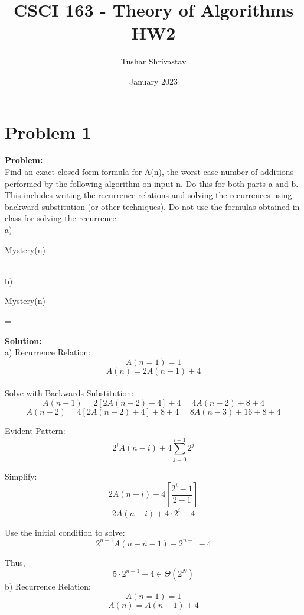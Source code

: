 \documentclass{article}
\title{CSCI 163 - Theory of Algorithms HW2}
\author{Tushar Shrivastav}
\date{January 2023}
\begin{document}
\maketitle

\section{Problem 1}
\textbf{Problem: }\\
Find an exact closed-form formula for A(n), the worst-case number of additions performed by the following algorithm on input n. Do this for both parts a
and b. This includes writing the recurrence relations and solving the recurrences using
backward substitution (or other techniques). Do not use the formulas obtained in class
for solving the recurrence. \\

a)
\begin{algorithm}
\caption{Mystery(n)}
\end{algorithm} \\
b)
\begin{algorithm}
\caption{Mystery(n)}
\temp = 
\end{algorithm}

\textbf{Solution: } \\

a)
Recurrence Relation: \\
\[A(n=1) = 1\]
\[A(n) = 2A(n-1) + 4\] \\

Solve with Backwards Substitution: \\
\[A(n-1) = 2[2A(n-2)+4] + 4 = 4A(n-2) + 8 + 4\]
\[A(n-2) = 4[2A(n-2) + 4] + 8 + 4 = 8A(n-3) + 16 + 8 + 4\]

Evident Pattern: \\
\[2^iA(n-i) + 4\sum_{j=0}^{i-1} 2^j\]

Simplify: \\
\[2A(n-i) + 4[\frac{2^i - 1 }{2 - 1}]\]
\[2A(n-i) + 4\cdot 2^i - 4\]

Use the initial condition to solve: \\
\[2^{n-1}A(n-n-1) + 2^{n-1} - 4\]

Thus,
\[5\cdot2^{n-1} - 4 \in \Theta(2^N)\]
b) Recurrence Relation: \\
\[A(n=1)=1\]
\[A(n) = A(n-1) + 4\]
\end{document}
